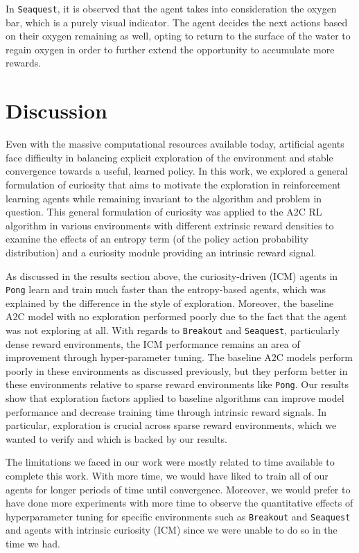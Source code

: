 \documentclass{article}
\begin{document}
In \texttt{Seaquest}, it is observed that the agent takes into consideration the oxygen bar, which is a purely visual indicator. The agent decides the next actions based on their oxygen remaining as well, opting to return to the surface of the water to regain oxygen in order to further extend the opportunity to accumulate more rewards.

\section{Discussion}
Even with the massive computational resources available today, artificial agents face difficulty in balancing explicit exploration of the environment and stable convergence towards a useful, learned policy. In this work, we explored a general formulation of curiosity that aims to motivate the exploration in reinforcement learning agents while remaining invariant to the algorithm and problem in question. This general formulation of curiosity was applied to the A2C RL algorithm in various environments with different extrinsic reward densities to examine the effects of an entropy term (of the policy action probability distribution) and a curiosity module providing an intrinsic reward signal.

As discussed in the results section above, the curiosity-driven (ICM) agents in \texttt{Pong} learn and train much faster than the entropy-based agents, which was explained by the difference in the style of exploration. Moreover, the baseline A2C model with no exploration performed poorly due to the fact that the agent was not exploring at all. With regards to \texttt{Breakout} and \texttt{Seaquest}, particularly dense reward environments, the ICM performance remains an area of improvement through hyper-parameter tuning. The baseline A2C models perform poorly in these environments as discussed previously, but they perform better in these environments relative to sparse reward environments like \texttt{Pong}. Our results show that exploration factors applied to baseline algorithms can improve model performance and decrease training time through intrinsic reward signals. In particular, exploration is crucial across sparse reward environments, which we wanted to verify and which is backed by our results.

The limitations we faced in our work were mostly related to time available to complete this work. With more time, we would have liked to train all of  our agents for longer periods of time until convergence. Moreover, we would prefer to have done more experiments with more time to observe the quantitative effects of hyperparameter tuning for specific environments such as \texttt{Breakout} and \texttt{Seaquest} and agents with intrinsic curiosity (ICM) since we were unable to do so in the time we had.
\end{document}
